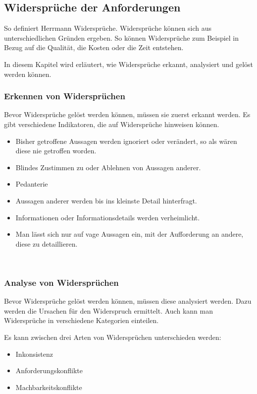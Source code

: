 \subsection{Widersprüche der Anforderungen}\label{subsec:widersprueche}
\autocite[][S.233]{Herrmann.2022}
So definiert Herrmann Widersprüche.
Widersprüche können sich aus unterschiedlichen Gründen ergeben.
So können Widersprüche zum Beispiel in Bezug auf die Qualität, die Kosten oder die Zeit entstehen.

In diesem Kapitel wird erläutert, wie Widersprüche erkannt, analysiert und gelöst werden können.

\subsubsection{Erkennen von Widersprüchen}\label{subsubsec:erkennung}
Bevor Widersprüche gelöst werden können, müssen sie zuerst erkannt werden.
Es gibt verschiedene Indikatoren, die auf Widersprüche hinweisen können.
\begin{itemize}
    \item Bisher getroffene Aussagen werden ignoriert oder verändert, so als wären diese nie getroffen worden.
    \item Blindes Zustimmen zu oder Ablehnen von Aussagen anderer.
    \item Pedanterie
    \item Aussagen anderer werden bis ins kleinste Detail hinterfragt.
    \item Informationen oder Informationsdetails werden verheimlicht.
    \item Man lässt sich nur auf vage Aussagen ein, mit der Aufforderung an andere, diese zu detaillieren.
\end{itemize}~\autocite[vgl.][S.43]{OliverCreighton.2012}

\subsubsection{Analyse von Widersprüchen}\label{subsubsec:analyse}
Bevor Widersprüche gelöst werden können, müssen diese analysiert werden.
Dazu werden die Ursachen für den Widerspruch ermittelt.
Auch kann man Widersprüche in verschiedene Kategorien einteilen.

Es kann zwischen drei Arten von Widersprüchen unterschieden werden:
\begin{itemize}
    \item Inkonsistenz
    \item Anforderungskonflikte
    \item Machbarkeitskonflikte
\end{itemize}~\autocite[vgl.][S.235f]{OliverCreighton.2012}

